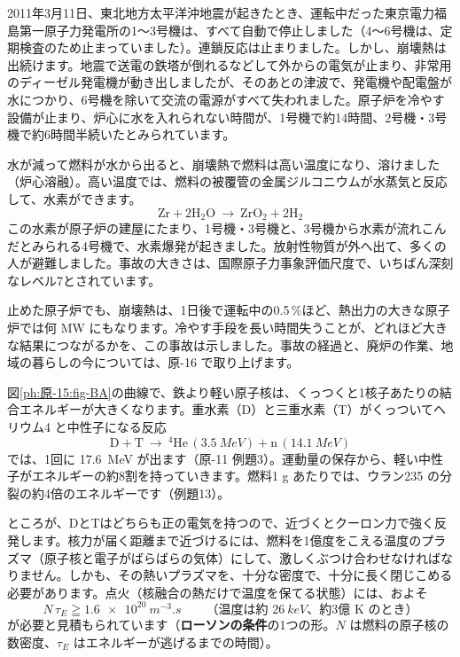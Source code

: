 2011年3月11日、東北地方太平洋沖地震が起きたとき、運転中だった東京電力福島第一原子力発電所の1〜3号機は、すべて自動で停止しました（4〜6号機は、定期検査のため止まっていました）。連鎖反応は止まりました。しかし、崩壊熱は出続けます。地震で送電の鉄塔が倒れるなどして外からの電気が止まり、非常用のディーゼル発電機が動き出しましたが、そのあとの津波で、発電機や配電盤が水につかり、6号機を除いて交流の電源がすべて失われました。原子炉を冷やす設備が止まり、炉心に水を入れられない時間が、1号機で約14時間、2号機・3号機で約6時間半続いたとみられています。

水が減って燃料が水から出ると、崩壊熱で燃料は高い温度になり、溶けました（炉心溶融）。高い温度では、燃料の被覆管の金属ジルコニウムが水蒸気と反応して、水素ができます。
\[ \mathrm{Zr}+2\mathrm{H_2O}\ \to\ \mathrm{ZrO_2}+2\mathrm{H_2} \]
この水素が原子炉の建屋にたまり、1号機・3号機と、3号機から水素が流れこんだとみられる4号機で、水素爆発が起きました。放射性物質が外へ出て、多くの人が避難しました。事故の大きさは、国際原子力事象評価尺度で、いちばん深刻なレベル7とされています。

止めた原子炉でも、崩壊熱は、1日後で運転中の0.5\,\%ほど、熱出力の大きな原子炉では何 MW にもなります。冷やす手段を長い時間失うことが、どれほど大きな結果につながるかを、この事故は示しました。事故の経過と、廃炉の作業、地域の暮らしの今については、原-16 で取り上げます。

\label{ph:原-15:sec12}
図\ref{ph:原-15:fig-BA}の曲線で、鉄より軽い原子核は、くっつくと1核子あたりの結合エネルギーが大きくなります。重水素（D）と三重水素（T）がくっついてヘリウム4 と中性子になる反応
\[ \mathrm{D}+\mathrm{T}\ \to\ {}^4\mathrm{He}\,(\qty{3.5}{MeV})+\mathrm{n}\,(\qty{14.1}{MeV}) \]
では、1回に \qty{17.6}{MeV} が出ます（原-11 例題3）。運動量の保存から、軽い中性子がエネルギーの約8割を持っていきます。燃料1 g あたりでは、ウラン235 の分裂の約4倍のエネルギーです（例題13）。

ところが、DとTはどちらも正の電気を持つので、近づくとクーロン力で強く反発します。核力が届く距離まで近づけるには、燃料を1億度をこえる温度のプラズマ（原子核と電子がばらばらの気体）にして、激しくぶつけ合わせなければなりません。しかも、その熱いプラズマを、十分な密度で、十分に長く閉じこめる必要があります。点火（核融合の熱だけで温度を保てる状態）には、およそ
\[ N\,\tau_E\geqq\qty{1.6e20}{m^{-3}.s}\qquad（\text{温度は約 }\qty{26}{keV}\text{、約3億 K のとき）} \]
が必要と見積もられています（\textbf{ローソンの条件}の1つの形。$N$ は燃料の原子核の数密度、$\tau_E$ はエネルギーが逃げるまでの時間）。

